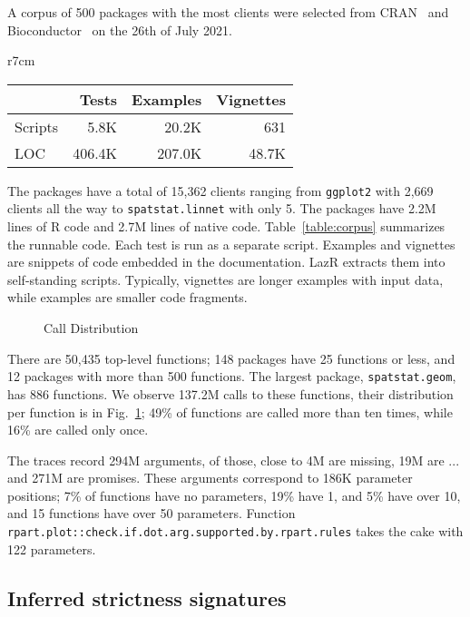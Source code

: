 \documentclass[review,creen,acmsmall]{acmart}
\renewcommand{\c}[1]{\lstinline |#1|\xspace}
\newcommand{\lazr}{{\sf LazR}\xspace}
\begin{document}
A corpus of 500 packages with the most clients were selected from
CRAN~\cite{ligges2017} and Bioconductor~\cite{bioc} on the 26th of July 2021.

\begin{wraptable}{r}{7cm}
\small\centering
  \caption{Corpus}\label{table:corpus}
  \begin{tabular}{lrrr}\toprule
    &\bf Tests&\bf Examples&\bf Vignettes\\\midrule
    {Scripts}&5.8K&20.2K&631\\\midrule
    {LOC}&406.4K&207.0K&48.7K\\\bottomrule
  \end{tabular}
\end{wraptable}%


The packages have a total of 15,362 clients ranging from \c{ggplot2} with 2,669
clients all the way to \c{spatstat.linnet} with only 5. The packages have 2.2M
lines of R code and 2.7M lines of native code. Table~\ref{table:corpus}
summarizes the runnable code. Each test is run as a separate script. Examples
and vignettes are snippets of code embedded in the documentation. \lazr extracts
them into self-standing scripts. Typically, vignettes are longer examples with
input data, while examples are smaller code fragments.


\begin{figure}[!h]  \centering
  
  \caption{Call Distribution}\label{fig:callDist}
\end{figure}

There are 50,435 top-level functions; 148 packages have 25 functions or less,
and 12 packages with more than 500 functions. The largest package,
\c{spatstat.geom}, has 886 functions. We observe 137.2M calls to these
functions, their distribution per function is in Fig.~\ref{fig:callDist}; 49\%
of functions are called more than ten times, while 16\% are called only once.

The traces record 294M arguments, of those, close to 4M are missing, 19M are
$...$ and 271M are promises. These arguments correspond to 186K parameter
positions; 7\% of functions have no parameters, 19\% have 1, and 5\% have over
10, and 15 functions have over 50 parameters. Function
\c{rpart.plot::check.if.dot.arg.supported.by.rpart.rules} takes the cake with
122 parameters.

\subsection{Inferred strictness signatures}\label{sec:results}
\end{document}
